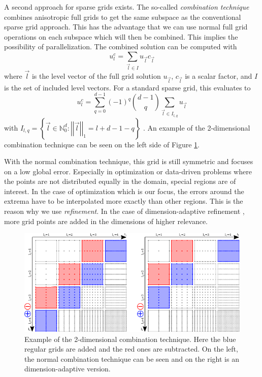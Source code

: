 A second approach for sparse grids exists. The so-called \textit{combination technique} \cite{griebel1990combination} combines anisotropic full grids to get the same subspace as the conventional sparse grid approach. This has the advantage that we can use normal full grid operations on each subspace which will then be combined. This implies the possibility of parallelization. The combined solution can be computed with 
\begin{equation}
	u_l^c = \sum_{ \vec{l} \in I } u_{\vec{l}} c_{\vec{l}}
\end{equation}
where $ \vec{l} $ is the level vector of the full grid solution $ u_{\vec{l}} $, $ c_{\vec{l}} $ is a scalar factor, and $ I $ is the set of included level vectors. For a standard sparse grid, this evaluates to 
\begin{equation}
	u_l^c = \sum_{ q = 0 }^{d-1} (-1)^q \binom{d-1}{q} \sum_{\vec{l} \in I_{l,q} } u_{\vec{l}}
\end{equation}
with $ I_{l,q} = \left\{ \vec{l} \in \mathbb{N}_0^d : \left|\left|\vec{l}\right|\right|_1 = l+d-1-q \right\} $ \cite{obersteiner2021generalized}. An example of the 2-dimensional combination technique can be seen on the left side of Figure \ref{fig:combi_technique}.

With the normal combination technique, this grid is still symmetric and focuses on a low global error. Especially in optimization or data-driven problems where the points are not distributed equally in the domain, special regions are of interest. In the case of optimization which is our focus, the errors around the extrema have to be interpolated more exactly than other regions. This is the reason why we use \textit{refinement}. In the case of dimension-adaptive refinement \cite{hegland2002adaptive}, more grid points are added in the dimensions of higher relevance. 

\begin{figure}[H]
	\centering
	\includegraphics[width=\textwidth]{figures/Fig_2_10_combi}
	\caption{ Example of the 2-dimensional combination technique. Here the blue regular grids are added and the red ones are subtracted. On the left, the normal combination technique can be seen and on the right is an dimension-adaptive version. }
	\label{fig:combi_technique}
\end{figure}


